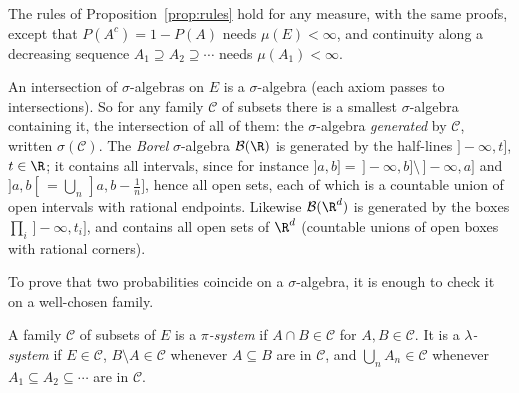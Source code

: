 The rules of Proposition~\ref{prop:rules} hold for any measure, with the same proofs, except that $P(A^c)=1-P(A)$
needs $\mu(E)<\infty$, and continuity along a decreasing sequence $A_1\supseteq A_2\supseteq\cdots$ needs $\mu(A_1)<\infty$.

An intersection of $\sigma$-algebras on $E$ is a $\sigma$-algebra (each axiom passes to intersections). So for any family
$\mathcal C$ of subsets there is a smallest $\sigma$-algebra containing it, the intersection of all of them: the $\sigma$-algebra
\emph{generated} by $\mathcal C$, written $\sigma(\mathcal C)$. The \emph{Borel} $\sigma$-algebra $\mathcal B(\R)$ is generated by the half-lines
$]-\infty,t]$, $t\in\R$; it contains all intervals, since for instance $]a,b]=\,]-\infty,b]\setminus\,]-\infty,a]$ and
$]a,b[\,=\bigcup_n\,]a,b-\frac1n]$, hence all open sets, each of which is a countable union of open intervals with
rational endpoints. Likewise $\mathcal B(\R^d)$ is generated by the boxes $\prod_i\,]-\infty,t_i]$, and contains all open sets of
$\R^d$ (countable unions of open boxes with rational corners).

To prove that two probabilities coincide on a $\sigma$-algebra, it is enough to check it on a well-chosen family.

\begin{definition}
A family $\mathcal C$ of subsets of $E$ is a \emph{$\pi$-system} if $A\cap B\in\mathcal C$ for $A,B\in\mathcal C$. It is a \emph{$\lambda$-system} if $E\in\mathcal C$,
$B\setminus A\in\mathcal C$ whenever $A\subseteq B$ are in $\mathcal C$, and $\bigcup_nA_n\in\mathcal C$ whenever $A_1\subseteq A_2\subseteq\cdots$ are in $\mathcal C$.
\end{definition}

